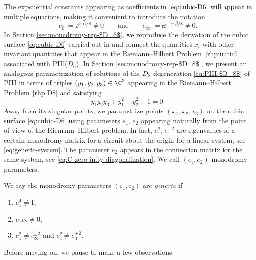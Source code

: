 The exponential constants appearing as coefficients in \eqref{eq:cubic-D6} will appear in multiple equations, making it convenient to introduce the notation
\begin{equation}
 e_0:=\ee^{{\ii\pi\alpha}/{8}}\neq 0 \qquad \text{and} \qquad e_\infty:=\ii\ee^{-{\ii\pi\beta}/{8}}\neq 0.
 \label{eq:e0-einfty-alpha-beta}
\end{equation}
In Section \ref{sec:monodromy-rep-$D_6$}, we reproduce the derivation of the cubic surface \eqref{eq:cubic-D6} carried out in \cite{PS} and connect the quantities $x_i$ with other invariant quantities that appear in the Riemann--Hilbert Problem~\ref{rhp:initial} associated with PIII($D_6$). In Section \ref{sec:monodromy-rep-$D_8$}, we present an analogous parametrization of solutions of the $D_8$ degeneration \eqref{eq:PIII-$D_8$} of PIII in terms of triples $(y_1, y_2, y_3) \in \C^3$ appearing in the Riemann--Hilbert Problem~\ref{rhp:D8} and satisfying
\begin{equation}
\label{eq:cubic-D8}
y_1 y_2 y_3 + y_1^2 + y_2^2 + 1 = 0.
\end{equation}
Away from its singular points, we parametrize points $(x_1,x_2,x_3)$ on the cubic surface \eqref{eq:cubic-D6} using parameters $e_1$, $e_2$ appearing naturally from the point of view of the Riemann--Hilbert problem. In fact, $e_1^2$, $e_1^{-2}$ are eigenvalues of a certain monodromy matrix for a circuit about the origin for a linear system, see \eqref{eq:generic-system}. The parameter $e_2$ appears in the connection matrix for the same system, see \eqref{eq:C-zero-infty-diagonalization}.
We call $(e_1,e_2)$ monodromy parameters.
\begin{Definition}\label{def:generic}\samepage
We say the monodromy parameters $(e_1, e_2)$ are \emph{generic} if
 \begin{enumerate}\itemsep=0pt
 \item[(i)] $e_1^4 \neq 1$,
 \item[(ii)] $e_1 e_2 \neq 0$,
 \item[(iii)] $e_1^2 \neq e_\infty^{\pm 2}$ and $e_1^2 \neq e_0^{\pm 2}$.
 \end{enumerate}
\end{Definition}
Before moving on, we pause to make a few observations.

